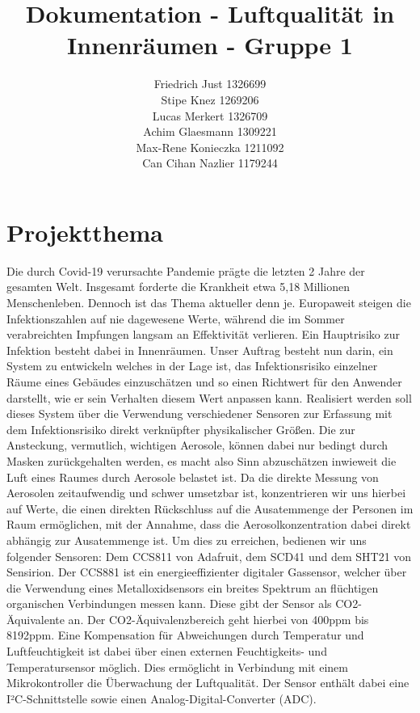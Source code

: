 \documentclass[]{article}
\title{Dokumentation - Luftqualität in Innenräumen - Gruppe 1}
\author{Friedrich Just 1326699 \\ Stipe Knez 1269206 \\ Lucas Merkert 1326709 \\ Achim Glaesmann 1309221 \\ Max-Rene Konieczka 1211092 \\ Can Cihan Nazlier 1179244}
\begin{document}
	\begin{titlepage}
		\maketitle
		\thispagestyle{empty}
	\end{titlepage}
	\tableofcontents
	\setcounter{page}{1}
	\newpage
	
	
	\section{Projektthema}
	Die durch Covid-19 verursachte Pandemie prägte die letzten 2 Jahre der gesamten Welt. Insgesamt forderte die Krankheit etwa 5,18 Millionen Menschenleben. Dennoch ist das Thema aktueller denn je. Europaweit steigen die Infektionszahlen auf nie dagewesene Werte, während die im Sommer verabreichten Impfungen langsam an Effektivität verlieren. Ein Hauptrisiko zur Infektion besteht dabei in Innenräumen. Unser Auftrag besteht nun darin, ein System zu entwickeln welches in der Lage ist, das Infektionsrisiko einzelner Räume eines Gebäudes einzuschätzen und so einen Richtwert für den Anwender darstellt, wie er sein Verhalten diesem Wert anpassen kann. Realisiert werden soll dieses System über die Verwendung verschiedener Sensoren zur Erfassung mit dem Infektionsrisiko direkt verknüpfter physikalischer Größen. Die zur Ansteckung, vermutlich, wichtigen Aerosole, können dabei nur bedingt durch Masken zurückgehalten werden, es macht also Sinn abzuschätzen inwieweit die Luft eines Raumes durch Aerosole belastet ist. Da die direkte Messung von Aerosolen zeitaufwendig und schwer umsetzbar ist, konzentrieren wir uns hierbei auf Werte, die einen direkten Rückschluss auf die Ausatemmenge der Personen im Raum ermöglichen, mit der Annahme, dass die Aerosolkonzentration dabei direkt abhängig zur Ausatemmenge ist.\newline
	Um dies zu erreichen, bedienen wir uns folgender Sensoren: Dem CCS811 von Adafruit, dem SCD41 und dem SHT21 von Sensirion. Der CCS881 ist ein energieeffizienter digitaler Gassensor, welcher über die Verwendung eines Metalloxidsensors ein breites Spektrum an flüchtigen organischen Verbindungen messen kann. Diese gibt der Sensor als CO2-Äquivalente an. Der CO2-Äquivalenzbereich geht hierbei von 400ppm bis 8192ppm. Eine Kompensation für Abweichungen durch Temperatur und Luftfeuchtigkeit ist dabei über einen externen Feuchtigkeits- und Temperatursensor möglich. Dies ermöglicht in Verbindung mit einem Mikrokontroller die Überwachung der Luftqualität. Der Sensor enthält dabei eine I²C-Schnittstelle sowie einen Analog-Digital-Converter (ADC).
\end{document}
